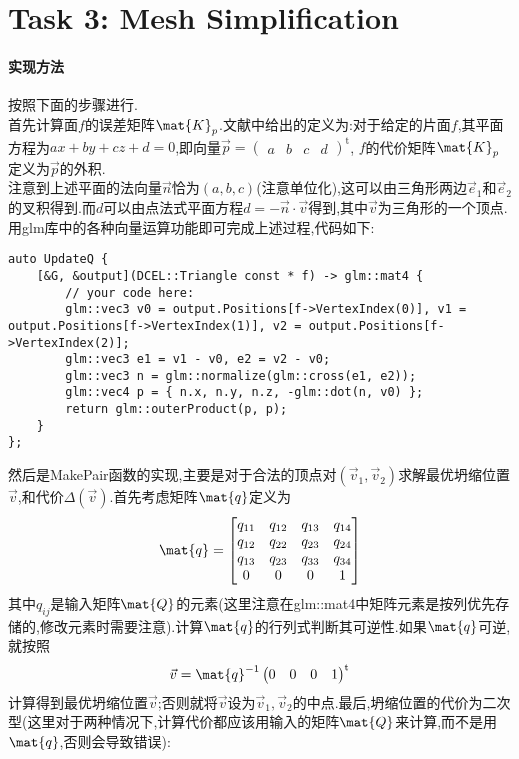 \documentclass{ctexart}
\begin{document}
\section*{Task 3: Mesh Simplification}
\paragraph{实现方法}
按照下面的步骤进行.\\
\indent 首先计算面$f$的误差矩阵$\mat{K}_p$.文献中给出的定义为:对于给定的片面$f$,其平面方程为$ax+by+cz+d=0$,即向量$\vec{p}=\begin{pmatrix}
    a&b&c&d
\end{pmatrix}^{\text{t}}$, $f$的代价矩阵$\mat{K}_p$定义为$\vec{p}$的外积.\\
\indent 注意到上述平面的法向量$\vec{n}$恰为$(a,b,c)$(注意单位化),这可以由三角形两边$\vec{e}_1$和$\vec{e}_2$的叉积得到.而$d$可以由点法式平面方程$d=-\vec{n}\cdot\vec{v}$得到,其中$\vec{v}$为三角形的一个顶点.用{\codefont glm}库中的各种向量运算功能即可完成上述过程,代码如下:
\begin{lstlisting}
auto UpdateQ {
    [&G, &output](DCEL::Triangle const * f) -> glm::mat4 {
        // your code here:
        glm::vec3 v0 = output.Positions[f->VertexIndex(0)], v1 = output.Positions[f->VertexIndex(1)], v2 = output.Positions[f->VertexIndex(2)];
        glm::vec3 e1 = v1 - v0, e2 = v2 - v0;
        glm::vec3 n = glm::normalize(glm::cross(e1, e2));
        glm::vec4 p = { n.x, n.y, n.z, -glm::dot(n, v0) };
        return glm::outerProduct(p, p);
    }
};
\end{lstlisting}
然后是{\codefont MakePair}函数的实现,主要是对于合法的顶点对$\left(\vec{v}_1,\vec{v}_2\right)$求解最优坍缩位置$\vec{v}$,和代价$\Delta(\vec{v})$.首先考虑矩阵$\mat{q}$定义为
\[\mat{q}=\begin{bmatrix}
    q_{11}&q_{12}&q_{13}&q_{14}\\
    q_{12}&q_{22}&q_{23}&q_{24}\\
    q_{13}&q_{23}&q_{33}&q_{34}\\
    0&0&0&1
\end{bmatrix}\]
其中$q_{ij}$是输入矩阵$\mat{Q}$的元素(这里注意在{\codefont glm::mat4}中矩阵元素是按列优先存储的,修改元素时需要注意).计算$\mat{q}$的行列式判断其可逆性.如果$\mat{q}$可逆,就按照
\[\vec{v}=\mat{q}^{-1}\begin{pmatrix}
    0&0&0&1
\end{pmatrix}^{\text{t}}\]
计算得到最优坍缩位置$\vec{v}$;否则就将$\vec{v}$设为$\vec{v}_1,\vec{v}_2$的中点.最后,坍缩位置的代价为二次型(这里对于两种情况下,计算代价都应该用输入的矩阵$\mat{Q}$来计算,而不是用$\mat{q}$,否则会导致错误):
\end{document}
